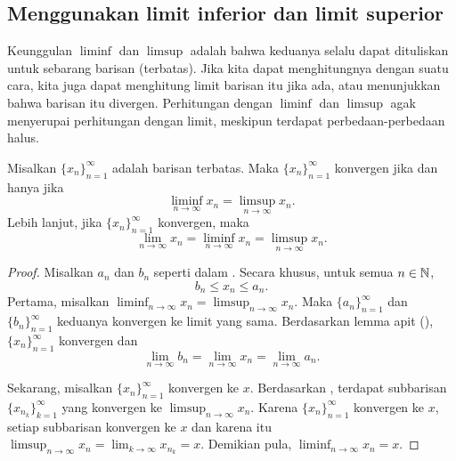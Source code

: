 \subsection{Menggunakan limit inferior dan limit superior}

Keunggulan $\liminf$ dan $\limsup$ adalah bahwa keduanya selalu dapat dituliskan
untuk sebarang barisan (terbatas).
Jika kita dapat menghitungnya dengan suatu cara, kita juga dapat menghitung limit
barisan itu jika ada, atau menunjukkan bahwa barisan itu divergen.
Perhitungan dengan $\liminf$ dan $\limsup$ agak
menyerupai perhitungan dengan limit, meskipun terdapat perbedaan-perbedaan halus.

\begin{prop} \label{liminfsupconv:prop}
Misalkan $\{ x_n \}_{n=1}^\infty$ adalah barisan terbatas.  Maka
$\{ x_n \}_{n=1}^\infty$ konvergen
jika dan hanya jika
\begin{equation*}
\liminf_{n\to \infty} x_n = 
\limsup_{n\to \infty} x_n.
\end{equation*}
Lebih lanjut, jika $\{ x_n \}_{n=1}^\infty$ konvergen, maka
\begin{equation*}
\lim_{n\to \infty} x_n = 
\liminf_{n\to \infty} x_n = 
\limsup_{n\to \infty} x_n.
\end{equation*}
\end{prop}

\begin{proof}
Misalkan $a_n$ dan $b_n$ seperti dalam .
Secara khusus, untuk semua $n \in {\mathbb{N}}$,
\begin{equation*}
b_n \leq x_n \leq a_n .
\end{equation*}
Pertama, misalkan
$\liminf_{n\to\infty} x_n = \limsup_{n\to\infty} x_n$.
Maka $\{ a_n \}_{n=1}^\infty$ dan $\{ b_n \}_{n=1}^\infty$
keduanya konvergen ke limit yang sama.
Berdasarkan lemma apit
(), $\{ x_n \}_{n=1}^\infty$ konvergen dan
\begin{equation*}
\lim_{n\to \infty} b_n
=
\lim_{n\to \infty} x_n
=
\lim_{n\to \infty} a_n .
\end{equation*}

Sekarang, misalkan $\{ x_n \}_{n=1}^\infty$ konvergen ke $x$.
Berdasarkan ,
terdapat subbarisan $\{ x_{n_k} \}_{k=1}^\infty$
yang konvergen ke $\limsup_{n\to\infty} x_n$.
Karena $\{ x_n \}_{n=1}^\infty$ konvergen ke $x$,
setiap subbarisan konvergen ke $x$ dan
karena itu $\limsup_{n\to\infty} x_n = \lim_{k\to\infty} x_{n_k} = x$.
Demikian pula, $\liminf_{n\to\infty} x_n = x$.
\end{proof}

